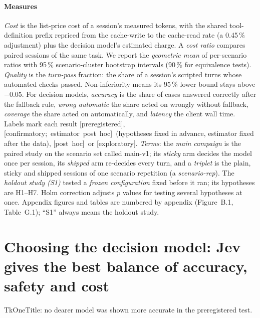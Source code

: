 \documentclass[11pt,letterpaper]{article}
\newcommand{\prereg}{\mbox{\textsf{\small\color{okblue}[preregistered]}}}
\newcommand{\posthoc}{\mbox{\textsf{\small\color{okgray}[post hoc]}}}
\newcommand{\confpost}{\mbox{\textsf{\small\color{okblue}[confirmatory; estimator post hoc]}}}
\newcommand{\expl}{\mbox{\textsf{\small\color{okgray}[exploratory]}}}
\newcommand{\term}[1]{\emph{#1}}
\newcommand{\TkTitle}[1]{\csname Tk#1Title\endcsname}
\newcommand{\NIMargin}{$-$0.05}
\newcommand{\NormShareMain}{0.45}
\begin{document}
\paragraph{Measures} \emph{Cost} is the list-price cost of a session's measured tokens, with the shared
tool-definition prefix repriced from the cache-write to the cache-read rate (a \NormShareMain\,\% adjustment) plus the
decision model's estimated charge. A \term{cost ratio} compares paired sessions of the same task. We report the
\term{geometric mean} of per-scenario ratios with 95\,\% scenario-cluster bootstrap intervals (90\,\% for
equivalence tests). \emph{Quality} is the \term{turn-pass} fraction: the share of a session's scripted turns whose
automated checks passed. Non-inferiority means its 95\,\% lower bound stays above \NIMargin. For decision models,
\emph{accuracy} is the share of cases answered correctly after the fallback rule, \emph{wrong automatic} the share
acted on wrongly without fallback, \emph{coverage} the share acted on automatically, and \emph{latency} the client
wall time. Labels mark each result \prereg, \confpost\ (hypotheses fixed in advance, estimator fixed after the data), \posthoc\
or \expl. \emph{Terms}: the \emph{main campaign} is the paired study on the scenario set called main-v1; its
\emph{sticky} arm decides the model once per session, its \emph{shipped} arm re-decides every turn, and a
\emph{triplet} is the plain, sticky and shipped sessions of one scenario repetition (a \emph{scenario-rep}). The
\emph{holdout study (S1)} tested a \emph{frozen configuration} fixed before it ran; its hypotheses are H1--H7. Holm
correction adjusts $p$ values for testing several hypotheses at once. Appendix figures and tables are numbered by appendix (Figure~B.1, Table~G.1); ``S1'' always means the
holdout study.
\section{Choosing the decision model: Jev gives the best balance of accuracy, safety and cost}\label{sec:choose}

\begin{claimbox}
\TkTitle{One}: no dearer model was shown more accurate in the preregistered test.
\end{claimbox}
\end{document}
